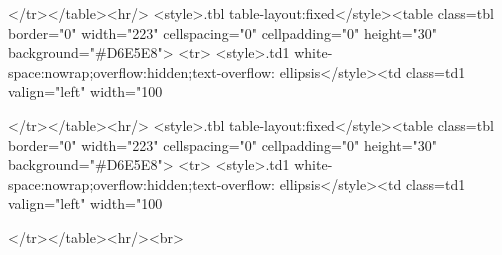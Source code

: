 </tr></table><hr/>
<style>.tbl {table-layout:fixed}</style><table class=tbl border="0" width="223" cellspacing="0" cellpadding="0" height="30" background="#D6E5E8">
<tr>
<style>.td1 {white-space:nowrap;overflow:hidden;text-overflow: ellipsis}</style><td class=td1 valign="left" width="100%

</tr></table><hr/>
<style>.tbl {table-layout:fixed}</style><table class=tbl border="0" width="223" cellspacing="0" cellpadding="0" height="30" background="#D6E5E8">
<tr>
<style>.td1 {white-space:nowrap;overflow:hidden;text-overflow: ellipsis}</style><td class=td1 valign="left" width="100%

</tr></table><hr/><br>

